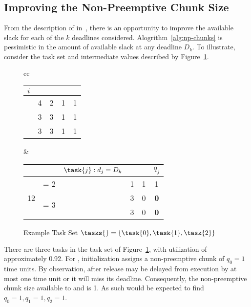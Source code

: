 \subsection{Improving the Non-Preemptive Chunk Size}
\label{sec:improve-np-chunk}

From the description of \npchunks{} in~\cite{Baruah:2005}, there is
an opportunity to improve the available slack for each of the ${k}$
deadlines considered. Alogrithm~\ref{alg:np-chunks} is pessimistic in
the amount of available slack at any deadline ${D_k}$. To illustrate,
consider the task set and intermediate values described by
Figure~\ref{fig:exbad}. 

\begin{figure}[H]
  \begin{tabular}{cc}
    \begin{tabular}{|c|c|c|c|c|}
      \hline
      ${i}$ & \period{i} & \deadline{i} & \taskthreads{i} &
      \wcet{i}{\taskthreads{i}} \\
      \hline
      \task{0} & 4 & 2 & 1 & 1 \\
      \task{1} & 3 & 3 & 1 & 1 \\
      \task{2} & 3 & 3 & 1 & 1 \\
      \hline
    \end{tabular}
    &
    \begin{tabular}{|c||c|c|c|c||c|}
      \hline
      \hp & \Deadline{k} & ${\task{j}: d_j = D_k}$ & \dbf{\tasks}{\Deadline{i}}
      & \slack{\Deadline{i}} & ${q_j}$\\
      \hline
      \multirow{3}{*}{12}
      & \Deadline{1} = 2 & \task{0} & 1 & 1 & 1\\
      \cline{2-6}
      & \multirow{2}{*}{\Deadline{2} = 3} & \task{1} & 3 & 0 & \textbf{0}\\
      & & \task{2} & 3 & 0 & \textbf{0}\\      
      \hline
    \end{tabular}
  \end{tabular}
  \caption{Example Task Set ${\tasks{} = \{ \task{0}, \task{1}, \task{2} \}}$}
  \label{fig:exbad}
\end{figure}

There are three tasks in the task set of Figure~\ref{fig:exbad}, with 
utilization of approximately 0.92. For , initialization
assigns a non-preemptive chunk of ${q_0 = 1}$ time units. By
observation, after release  may be delayed from execution by
at most one time unit or it will miss its deadline. Consequently, the
non-preemptive chunk size available to  and  is 1. As
such \npchunks{} would be expected to find ${q_0 = 1, q_1 = 1, q_2 =1}$.

